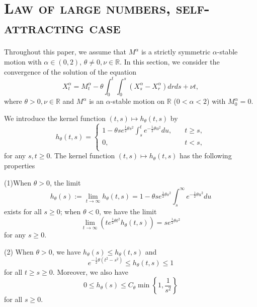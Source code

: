 \documentclass[11pt]{amsart}
\theoremstyle{plain}
\numberwithin{equation}{section}
\begin{document}
\section{\textsc{Law of large numbers, self-attracting case}}
Throughout this paper, we assume that $M^\alpha$ is a strictly symmetric $\alpha$-stable motion with $\alpha \in (0,2)$, $\theta \neq 0, \nu \in \mathbb{R}$. In this section, we consider the convergence of the solution of the equation
\begin{equation}\label{sec3-eq1}
X_t^\alpha = M_t^\alpha -\theta \int_0^t\int_0^s (X_s^\alpha - X_r^\alpha) dr ds +\nu t,
\end{equation}
where $\theta > 0,\nu \in \mathbb{R}$ and $M^\alpha$ is an $\alpha$-stable motion on $\mathbb{R}$ ($0<\alpha<2$) with $M^\alpha_0=0$.

We introduce the kernel function $(t,s)\mapsto h_\theta (t,s)$ by
\begin{equation}\label{sec3-eq2}
h_\theta(t,s) =
\begin{cases}
1-\theta s e^{\frac{1}{2}\theta s^2}\int_s^t e^{-\frac{1}{2}\theta u^2} du, &\quad t \geq s,\\
0 , &\quad t<s,\\
\end{cases}
\end{equation}
for any $s,t \geq 0$. The kernel function $(t,s)\mapsto h_\theta (t,s)$ has the following properties

(1)When $\theta >0$, the limit
\begin{equation*}
h_\theta (s):= \lim_{t\rightarrow \infty}h_\theta(t,s)=1-\theta se^{\frac{1}{2}\theta s^2}\int_s^\infty e^{-\frac{1}{2}\theta u^2}du
\end{equation*}
exists for all $s \geq 0$; when $\theta <0$, we have the limit
\begin{equation}
\lim_{t\rightarrow \infty} \left(te^{\frac{1}{2}\theta t^2}h_\theta(t,s)\right)=se^{\frac{1}{2}\theta s^2}
\end{equation}
for any $s \geq 0$.

(2) When $\theta >0$, we have $h_\theta (s) \leq h_\theta (t,s)$ and 
\begin{equation}
e^{-\frac{1}{2}\theta(t^2-s^2)}\leq h_\theta (t,s) \leq 1
\end{equation}
for all $t\geq s\geq 0$. Moreover, we also have 
\begin{equation*}
0 \leq h_\theta (s) \leq  C_\theta \min \left\{1,\frac{1}{s^2}\right\}
\end{equation*}
for all $s\geq 0$.
\end{document}
